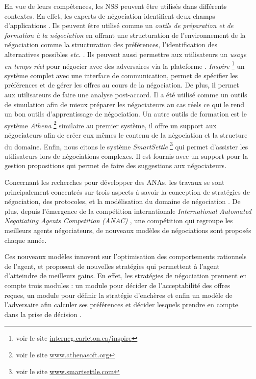 	 En vue de leurs compétences, les NSS peuvent être utilisés dans différents contextes. En effet, les experts de négociation identifient deux champs d'applications \cite{pommeranz2009design}. Ils peuvent être utilisé comme un \textit{outils de préparation et de formation à la négociation} en offrant une structuration de l'environnement de la négociation comme la structuration des préférences, l'identification des alternatives possibles \emph{etc.} \cite{broekens2010affective}.  Ils peuvent aussi permettre aux utilisateurs un \textit{usage en temps réel} pour négocier avec des adversaires via la plateforme \cite{pommeranz2009design}. 
	 \emph{Inspire} \footnote{ voir le site \url{interneg.carleton.ca/inspire}} un système complet avec une interface de communication, permet de spécifier les préférences et de gérer les offres au cours de la négociation. De plus, il permet aux utilisateurs de faire une analyse post-accord. 
	 Il a été utilisé comme  un outils de simulation afin de mieux préparer les négociateurs au cas réels ce qui le rend un bon outils d'apprentissage de négociation. Un autre outils de formation est le système \emph{Athena} \footnote{ voir le site \url{www.athenasoft.org}} similaire au premier système, il offre un support aux négociateurs afin de créer eux mêmes le contenu de la négociation et la structure du domaine. Enfin, nous citons le système \emph{SmartSettle} \footnote{ voir le site \url{www.smartsettle.com}} qui permet d'assister les utilisateurs lors de négociations complexes. Il est fournis avec un support pour la gestion propositions qui permet de faire des suggestions aux négociateurs. 
	  
	Concernant les recherches pour développer des ANAs, les travaux se sont principalement concentrés sur trois aspects à savoir la conception de stratégies de négociation, des protocoles, et la modélisation du domaine de négociation \cite{jonker2012negotiating}. De plus, depuis l'émergence de la compétition internationale \emph{International Automated Negotiating Agents Competition (ANAC)} \cite{baarslag2012first,fujita2013second}, une compétition qui regroupe les meilleurs agents négociateurs, de nouveaux modèles de négociations sont proposés chaque année. 
	
	Ces nouveaux modèles innovent sur l'optimisation des comportements rationnels de l'agent, et proposent de nouvelles stratégies qui permettent à l'agent d'atteindre de meilleurs gains. 
	En effet, les stratégies de négociation prennent en compte trois modules : un module pour décider de l'acceptabilité des offres reçues, un module pour définir la stratégie d'enchères et enfin un modèle de l'adversaire afin calculer ses préférences et décider lesquels prendre en compte dans la prise de décision \cite{baarslag2014decoupling}.
	
